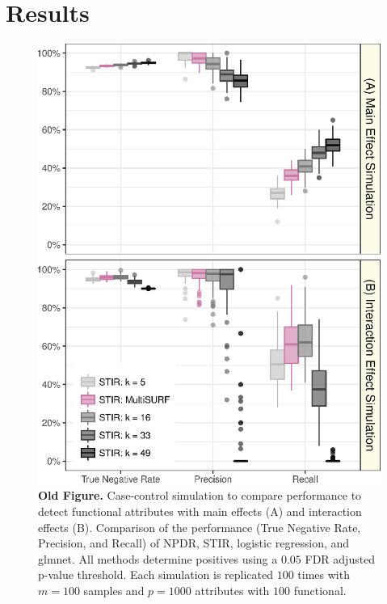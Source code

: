 \documentclass[10pt]{article}
\begin{document}

\section{Results}

\begin{figure}[!tbp]
\centerline{\includegraphics[trim = 0 0 0 0, scale = 0.69]{kAdjRevFacet}}
\caption{{\bf Old Figure.} Case-control simulation to compare performance to detect functional attributes with main effects (A) and interaction effects (B). Comparison of the performance (True Negative Rate, Precision, and Recall) of NPDR, STIR, logistic regression, and glmnet. All methods determine positives using a $0.05$ FDR adjusted p-value threshold. Each simulation is replicated $100$ times with $m=100$ samples and $p=1000$ attributes with $100$ functional.}\label{fig:compK}
\end{figure}
\end{document}
